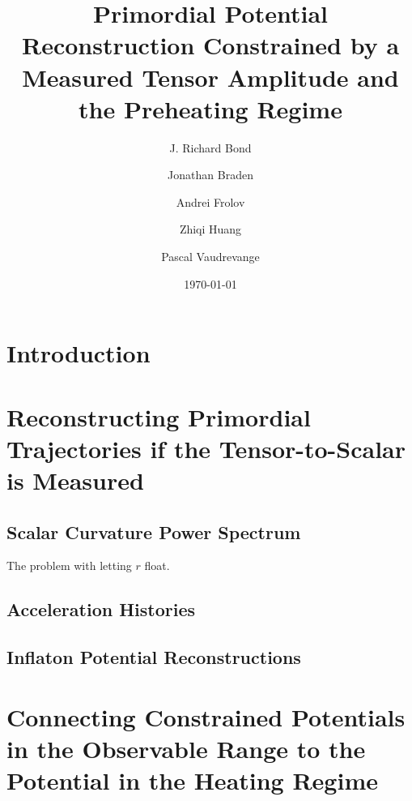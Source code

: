 \documentclass[11pt]{article}
\begin{document}
\title{Primordial Potential Reconstruction Constrained by a Measured Tensor Amplitude and the Preheating Regime}
\author[a]{J. Richard Bond}
\author[a,b]{Jonathan Braden}
\author[c]{Andrei Frolov}
\author[a]{Zhiqi Huang}
\author[d]{Pascal Vaudrevange}



\date{\today}
\maketitle

\section{Introduction}

\section{Reconstructing Primordial Trajectories if the Tensor-to-Scalar  is Measured}

\subsection{Scalar Curvature Power Spectrum }

The problem with letting $r$ float. 

\subsection{Acceleration Histories}

\subsection{Inflaton Potential Reconstructions}

\section{Connecting Constrained Potentials in the Observable Range to the Potential in the Heating Regime }
\end{document}
